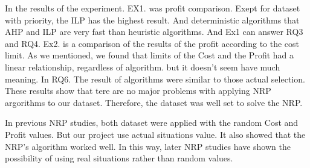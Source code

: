 In the results of the experiment.
EX1. was profit comparison. Exept for dataset with priority, the ILP has the highest result. And deterministic algorithms that AHP and ILP are very fast than heuristic algorithms. And Ex1 can answer RQ3 and RQ4. Ex2. is a comparison of the results of the profit according to the cost limit. As we mentioned, we found that limits of the Cost and the Profit had a linear relationship, regardless of algorithm. but it doesn't seem have much meaning. In RQ6. The result of algorithms were similar to those actual selection. These results show that tere are no major problems with applying NRP argorithms to our dataset. Therefore, the dataset was well set to solve the NRP.

In previous NRP studies, both dataset were applied with the random Cost and Profit values. But our project use actual situations value. It also showed that the NRP's algorithm worked well. In this way, later NRP studies have shown the possibility of using real situations rather than random values. 


